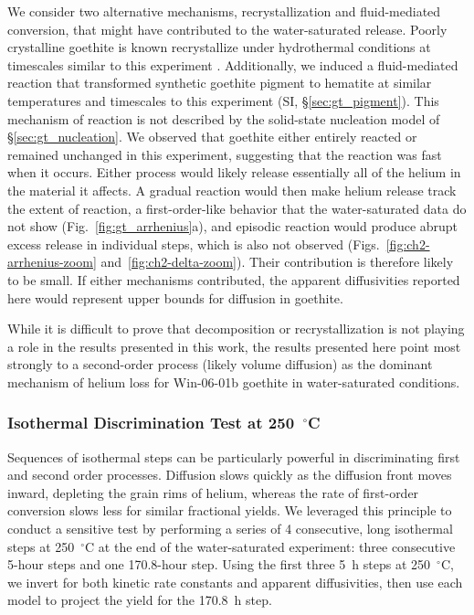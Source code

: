 We consider two alternative mechanisms, recrystallization and fluid-mediated conversion, that might have contributed to the water-saturated release.
Poorly crystalline goethite is known recrystallize under hydrothermal conditions at timescales similar to this experiment 
\citep{schwertmann1985}. Additionally, we induced a fluid-mediated reaction that transformed synthetic goethite pigment to 
hematite at similar temperatures and timescales to this experiment (SI, \S\ref{sec:gt_pigment}). This mechanism of reaction 
is not described by the solid-state nucleation model of \S\ref{sec:gt_nucleation}. We observed that goethite 
either entirely reacted or remained unchanged in this experiment, suggesting that the reaction was fast when it occurs. Either
process would likely release essentially all of the helium in the material it affects. A gradual 
reaction would then make helium release track the extent of reaction, a first-order-like behavior
that the water-saturated data do not show (Fig.~\ref{fig:gt_arrhenius}a), and episodic reaction would
produce abrupt excess release in individual steps, which is also not observed
(Figs.~\ref{fig:ch2-arrhenius-zoom} and~\ref{fig:ch2-delta-zoom}). Their contribution is therefore
likely to be small. If either mechanisms contributed, the apparent diffusivities reported here
would represent upper bounds for diffusion in goethite.

While it is difficult to prove that decomposition or recrystallization is not
playing a role in the results presented in this work, the results presented here point most strongly to
a second-order process (likely volume diffusion) as the dominant mechanism of helium loss for 
Win-06-01b goethite in water-saturated conditions.

\subsubsection{Isothermal Discrimination Test at 250~$^\circ$C}\label{sec:gt_hold_results}

Sequences of isothermal steps can be particularly powerful in discriminating first and second order processes.
Diffusion slows quickly as the diffusion front moves inward, depleting the grain
rims of helium, whereas the rate of first-order conversion slows less for similar fractional yields. We leveraged this 
principle to conduct a sensitive test
by performing a series of 4 consecutive, long isothermal steps at 250~$^\circ$C at the end of the water-saturated experiment: three consecutive 5-hour steps and one 170.8-hour step. Using the first three
5~h steps at 250~$^\circ$C, we invert for both kinetic rate constants and apparent diffusivities, then use each model to project the yield for the 170.8~h step.

